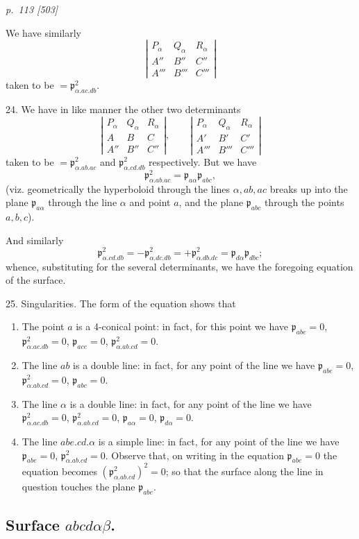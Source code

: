 \documentclass[11pt,a4paper]{article}
\newcommand{\sourcepage}[2]{%
  \bigskip
  \noindent\textit{p.~#1 [#2]}%
  \par\smallskip
}
\newcommand{\Det}[1]{\left|\begin{matrix}#1\end{matrix}\right|}
\newcommand{\p}{\mathfrak p}
\begin{document}
\sourcepage{113}{503}
We have similarly
\[
\Det{P_\alpha&Q_\alpha&R_\alpha\\A''&B''&C''\\A'''&B'''&C'''}
\]
taken to be $=\p^2_{\alpha.ac.db}$.

24. We have in like manner the other two determinants
\[
\Det{P_\alpha&Q_\alpha&R_\alpha\\A&B&C\\A''&B''&C''},
\qquad
\Det{P_\alpha&Q_\alpha&R_\alpha\\A'&B'&C'\\A'''&B'''&C'''}
\]
taken to be $=\p^2_{\alpha.ab.ac}$ and $\p^2_{\alpha.cd.db}$ respectively.
But we have
\[
\p^2_{\alpha.ab.ac}=\p_{a\alpha}\p_{abc},
\]
(viz. geometrically the hyperboloid through the lines $\alpha,ab,ac$ breaks up
into the plane $\p_{a\alpha}$ through the line $\alpha$ and point $a$, and the
plane $\p_{abc}$ through the points $a,b,c$).

And similarly
\[
\p^2_{\alpha.cd.db}=-\p^2_{\alpha.dc.db}
=+\p^2_{\alpha.db.dc}=\p_{d\alpha}\p_{dbc};
\]
whence, substituting for the several determinants, we have the foregoing equation
of the surface.

25. Singularities. The form of the equation shows that
\begin{enumerate}
\item[(0)] The point $a$ is a 4-conical point: in fact, for this point we have
$\p_{abe}=0$, $\p^2_{\alpha.ac.db}=0$, $\p_{ace}=0$,
$\p^2_{\alpha.ab.cd}=0$.
\item[(1)] The line $ab$ is a double line: in fact, for any point of the line we
have $\p_{abe}=0$, $\p^2_{\alpha.ab.cd}=0$, $\p_{abc}=0$.
\item[(2)] The line $\alpha$ is a double line: in fact, for any point of the line we
have $\p^2_{\alpha.ac.db}=0$, $\p^2_{\alpha.ab.cd}=0$,
$\p_{a\alpha}=0$, $\p_{d\alpha}=0$.
\item[(7)] The line $abe.cd.\alpha$ is a simple line: in fact, for any point of the
line we have $\p_{abe}=0$, $\p^2_{\alpha.ab.cd}=0$. Observe that, on writing in
the equation $\p_{abe}=0$ the equation becomes $(\p^2_{\alpha.ab.cd})^2=0$; so
that the surface along the line in question touches the plane $\p_{abe}$.
\end{enumerate}

\subsection*{Surface $abcd\alpha\beta$.}
\end{document}
